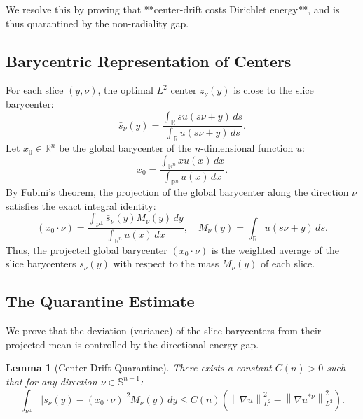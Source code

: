 \documentclass[11pt]{article}
\newtheorem{lemma}[theorem]{Lemma}
\theoremstyle{definition}
\newcommand{\R}{\mathbb R}
\newcommand{\Sph}{\mathbb S^{n-1}}
\newcommand{\norm}[1]{\left\|#1\right\|}
\newcommand{\abs}[1]{\left|#1\right|}
\begin{document}
We resolve this by proving that **center-drift costs Dirichlet energy**, and is thus quarantined by the non-radiality gap.

\subsection{Barycentric Representation of Centers}

For each slice $(y, \nu)$, the optimal $L^2$ center $z_\nu(y)$ is close to the slice barycenter:
\begin{equation}
\bar{s}_\nu(y) = \frac{\int_{\R} s u(s\nu + y) \, ds}{\int_{\R} u(s\nu + y) \, ds}.
\end{equation}
Let $x_0 \in \R^n$ be the global barycenter of the $n$-dimensional function $u$:
\begin{equation}
x_0 = \frac{\int_{\R^n} x u(x) \, dx}{\int_{\R^n} u(x) \, dx}.
\end{equation}
By Fubini's theorem, the projection of the global barycenter along the direction $\nu$ satisfies the exact integral identity:
\begin{equation}
(x_0 \cdot \nu) = \frac{\int_{\nu^\perp} \bar{s}_\nu(y) M_\nu(y) \, dy}{\int_{\R^n} u(x) \, dx}, \quad M_\nu(y) = \int_{\R} u(s\nu + y) \, ds.
\end{equation}
Thus, the projected global barycenter $(x_0 \cdot \nu)$ is the weighted average of the slice barycenters $\bar{s}_\nu(y)$ with respect to the mass $M_\nu(y)$ of each slice.

\subsection{The Quarantine Estimate}

We prove that the deviation (variance) of the slice barycenters from their projected mean is controlled by the directional energy gap.

\begin{lemma}[Center-Drift Quarantine]\label{lem:center-quarantine}
There exists a constant $C(n) > 0$ such that for any direction $\nu \in \Sph$:
\begin{equation}
\int_{\nu^\perp} \abs{\bar{s}_\nu(y) - (x_0 \cdot \nu)}^2 M_\nu(y) \, dy \le C(n) \left( \norm{\nabla u}_{L^2}^2 - \norm{\nabla u^{*\nu}}_{L^2}^2 \right).
\end{equation}
\end{lemma}
\end{document}
